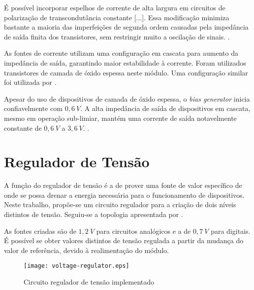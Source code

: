 \begin{citacao}
	É possível incorporar espelhos de corrente de alta largura em circuitos de polarização de transcondutância constante [...]. Essa modificação minimiza bastante a maioria das imperfeições de segunda ordem causadas pela impedância de saída finita dos transistores, sem restringir muito a oscilação de sinais. \cite{MARTIN:1997}.
\end{citacao}

As fontes de corrente utilizam uma configuração em cascata para aumento da impedância de saída, garantindo maior estabilidade à corrente. Foram utilizados transistores de camada de óxido espessa neste módulo. Uma configuração similar foi utilizada por .

\begin{citacao}
	Apesar do uso de dispositivos de camada de óxido espessa, o \textit{bias generator} inicia confiavelmente com $0,6~V$. A alta impedância de saída de dispositivos em cascata, mesmo em operação sub-limiar, mantém uma corrente de saída notavelmente constante de $0,6~V$ a $3,6~V$. \cite{YEAGER:2009}.
\end{citacao}


\section{Regulador de Tensão}
A função do regulador de tensão é a de prover uma fonte de valor específico de onde se possa drenar a energia necessária para o funcionamento de dispositivos. Neste trabalho, propõe-se um circuito regulador para a criação de dois níveis distintos de tensão. Seguiu-se a topologia apresentada por .

As fontes criadas são de $1,2~V$ para circuitos analógicos e a de $0,7~V$ para digitais. É possível se obter valores distintos de tensão regulada a partir da mudança do valor de referência, devido à realimentação do módulo.

\begin{figure}[!h]
	\caption{\label{fig:regulator}Circuito regulador de tensão implementado}
	\begin{center}
		\texttt{[image: voltage-regulator.eps]}
	\end{center}
\end{figure}

